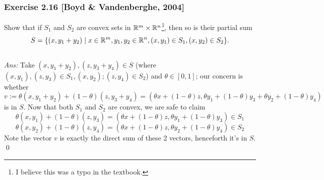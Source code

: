 \documentclass[12pt,a4paper]{article}
\newcommand{\red}[1]{\textcolor{red}{#1}}
\newcommand{\x}{\times}
\def\R{\ifmmode\mathbb R\fi}
\begin{document}
\newpage\subsubsection*{Exercise 2.16 [Boyd \& Vandenberghe, 2004]}
\noindent Show that if $S_1$ and $S_2$ are convex sets in \red{$\R^m \x \R^{n}$}\footnote{I believe this was a typo in the textbook.}, then so is their partial sum
$$S = \{(x, y_1+y_2) \mid  x\in \R^m, y_1, y_2 \in \R^n, (x, y_1)\in S_1, (x, y_2)\in S_2\}.$$
\\
{\it Ans:} Take $(x, y_1+y_2), (z, y_3+y_4) \in S$ (where $(x, y_1), (z, y_3) \in S_1, (x, y_2); (z, y_4) \in S_2$) and $\theta \in [0, 1]$; our concern is whether
$$v := \theta (x, y_1+y_2) + (1-\theta)(z, y_3 + y_4) = (\theta x + (1-\theta)z, \theta y_1+(1-\theta)y_3 + \theta y_2 + (1-\theta)y_4)$$
is in $S$. Now that both $S_1$ and $S_2$ are convex, we are safe to claim 
$$\theta (x, y_1) + (1-\theta)(z, y_3) = (\theta x + (1-\theta)z, \theta y_1 + (1-\theta)y_3) \in S_1$$
$$\theta (x, y_2) + (1-\theta)(z, y_4) = (\theta x + (1-\theta)z, \theta y_2 + (1-\theta)y_4) \in S_2$$
Note the vector $v$ is exactly the direct sum of these 2 vectors, henceforth it's in $S$. \qed
\end{document}
